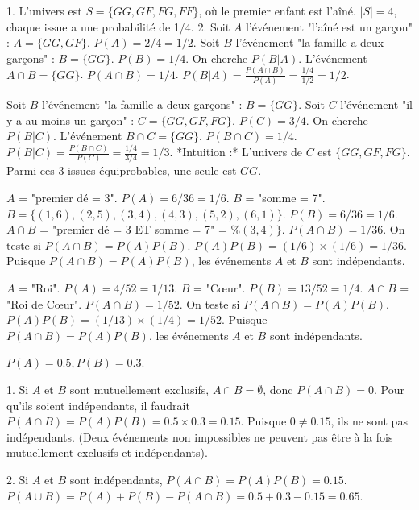 \begin{correctionbox}
1.  L'univers est $S = \{GG, GF, FG, FF\}$, où le premier enfant est l'aîné. $|S|=4$, chaque issue a une probabilité de 1/4.
2.  Soit $A$ l'événement "l'aîné est un garçon" : $A = \{GG, GF\}$. $P(A) = 2/4 = 1/2$.
    Soit $B$ l'événement "la famille a deux garçons" : $B = \{GG\}$. $P(B) = 1/4$.
    On cherche $P(B|A)$. L'événement $A \cap B = \{GG\}$. $P(A \cap B) = 1/4$.
    $P(B|A) = \frac{P(A \cap B)}{P(A)} = \frac{1/4}{1/2} = 1/2$.
\end{correctionbox}

\begin{correctionbox}
Soit $B$ l'événement "la famille a deux garçons" : $B = \{GG\}$.
Soit $C$ l'événement "il y a au moins un garçon" : $C = \{GG, GF, FG\}$. $P(C) = 3/4$.
On cherche $P(B|C)$.
L'événement $B \cap C = \{GG\}$. $P(B \cap C) = 1/4$.
$P(B|C) = \frac{P(B \cap C)}{P(C)} = \frac{1/4}{3/4} = 1/3$.
*Intuition :* L'univers de $C$ est $\{GG, GF, FG\}$. Parmi ces 3 issues équiprobables, une seule est $GG$.
\end{correctionbox}


\begin{correctionbox}
$A$ = "premier dé = 3". $P(A) = 6/36 = 1/6$.
$B$ = "somme = 7". $B = \{(1,6), (2,5), (3,4), (4,3), (5,2), (6,1)\}$. $P(B) = 6/36 = 1/6$.
$A \cap B$ = "premier dé = 3 ET somme = 7" = $\%(3,4)\}$. $P(A \cap B) = 1/36$.
On teste si $P(A \cap B) = P(A)P(B)$.
$P(A)P(B) = (1/6) \times (1/6) = 1/36$.
Puisque $P(A \cap B) = P(A)P(B)$, les événements $A$ et $B$ sont indépendants.
\end{correctionbox}

\begin{correctionbox}
$A$ = "Roi". $P(A) = 4/52 = 1/13$.
$B$ = "Cœur". $P(B) = 13/52 = 1/4$.
$A \cap B$ = "Roi de Cœur". $P(A \cap B) = 1/52$.
On teste si $P(A \cap B) = P(A)P(B)$.
$P(A)P(B) = (1/13) \times (1/4) = 1/52$.
Puisque $P(A \cap B) = P(A)P(B)$, les événements $A$ et $B$ sont indépendants.
\end{correctionbox}

\begin{correctionbox}
$P(A)=0.5, P(B)=0.3$.

1.  Si $A$ et $B$ sont mutuellement exclusifs, $A \cap B = \emptyset$, donc $P(A \cap B) = 0$.
    Pour qu'ils soient indépendants, il faudrait $P(A \cap B) = P(A)P(B) = 0.5 \times 0.3 = 0.15$.
    Puisque $0 \neq 0.15$, ils ne sont pas indépendants. (Deux événements non impossibles ne peuvent pas être à la fois mutuellement exclusifs et indépendants).

2.  Si $A$ et $B$ sont indépendants, $P(A \cap B) = P(A)P(B) = 0.15$.
    $P(A \cup B) = P(A) + P(B) - P(A \cap B) = 0.5 + 0.3 - 0.15 = 0.65$.
\end{correctionbox}

